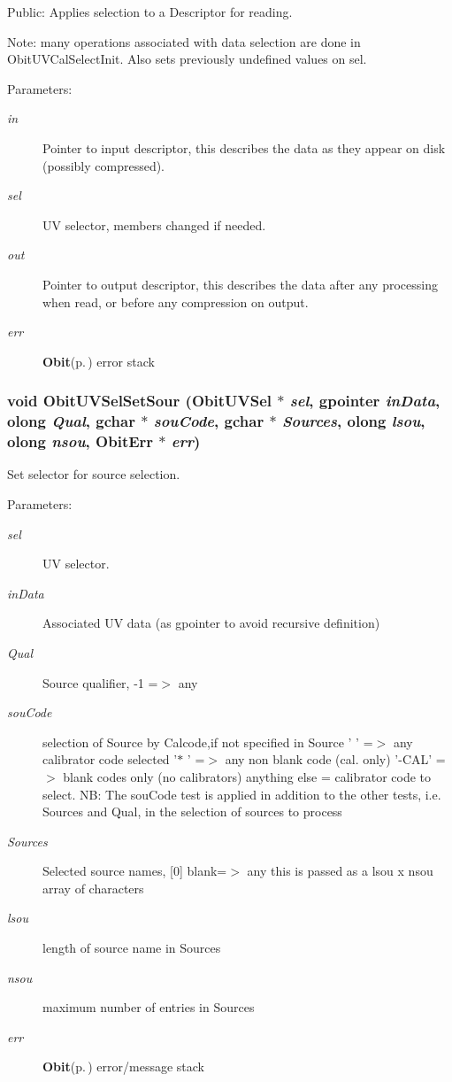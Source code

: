 Public: Applies selection to a Descriptor for reading. 

Note: many operations associated with data selection are done in Obit\-UVCal\-Select\-Init. Also sets previously undefined values on sel. \begin{Desc}
\item[Parameters:]
\begin{description}
\item[{\em in}]Pointer to input descriptor, this describes the data as they appear on disk (possibly compressed). \item[{\em sel}]UV selector, members changed if needed. \item[{\em out}]Pointer to output descriptor, this describes the data after any processing when read, or before any compression on output. \item[{\em err}]{\bf Obit}{\rm (p.\,\pageref{structObit})} error stack \end{description}
\end{Desc}
\subsubsection{\setlength{\rightskip}{0pt plus 5cm}void Obit\-UVSel\-Set\-Sour ({\bf Obit\-UVSel} $\ast$ {\em sel}, gpointer {\em in\-Data}, {\bf olong} {\em Qual}, gchar $\ast$ {\em sou\-Code}, gchar $\ast$ {\em Sources}, {\bf olong} {\em lsou}, {\bf olong} {\em nsou}, {\bf Obit\-Err} $\ast$ {\em err})}\label{ObitUVSel_8c_a17}


Set selector for source selection. 

\begin{Desc}
\item[Parameters:]
\begin{description}
\item[{\em sel}]UV selector. \item[{\em in\-Data}]Associated UV data (as gpointer to avoid recursive definition) \item[{\em Qual}]Source qualifier, -1 =$>$ any \item[{\em sou\-Code}]selection of Source by Calcode,if not specified in Source ' ' =$>$ any calibrator code selected '$\ast$ ' =$>$ any non blank code (cal. only) '-CAL' =$>$ blank codes only (no calibrators) anything else = calibrator code to select. NB: The sou\-Code test is applied in addition to the other tests, i.e. Sources and Qual, in the selection of sources to process \item[{\em Sources}]Selected source names, [0] blank=$>$ any this is passed as a lsou x nsou array of characters \item[{\em lsou}]length of source name in Sources \item[{\em nsou}]maximum number of entries in Sources \item[{\em err}]{\bf Obit}{\rm (p.\,\pageref{structObit})} error/message stack \end{description}
\end{Desc}
